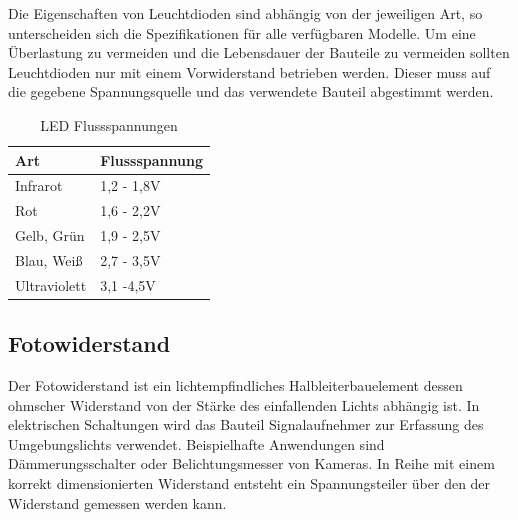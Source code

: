 Die Eigenschaften von Leuchtdioden sind abhängig von der jeweiligen Art, so unterscheiden sich die Spezifikationen für alle verfügbaren Modelle. Um eine Überlastung zu vermeiden und die Lebensdauer der Bauteile zu vermeiden sollten Leuchtdioden nur mit einem Vorwiderstand betrieben werden. Dieser muss auf die gegebene Spannungsquelle und das verwendete Bauteil abgestimmt werden.

\begin{table}[]
\centering
\caption{LED Flussspannungen}
\label{my-label}
\begin{tabular}{@{}|l|l|@{}}
\toprule
\rowcolor[HTML]{BBDAFF} 
Art          & Flussspannung \\ \midrule
Infrarot     & 1,2 - 1,8V    \\ \midrule
\rowcolor[HTML]{BBDAFF} 
Rot          & 1,6 - 2,2V    \\ \midrule
Gelb, Grün   & 1,9 - 2,5V    \\ \midrule
\rowcolor[HTML]{BBDAFF} 
Blau, Weiß   & 2,7 - 3,5V    \\ \midrule
Ultraviolett & 3,1 -4,5V     \\ \bottomrule
\end{tabular}
\end{table}

\subsection{Fotowiderstand}

Der Fotowiderstand ist ein lichtempfindliches Halbleiterbauelement dessen ohmscher Widerstand von der Stärke des einfallenden Lichts abhängig ist. In elektrischen Schaltungen wird das Bauteil Signalaufnehmer zur Erfassung des Umgebungslichts verwendet. Beispielhafte Anwendungen sind Dämmerungsschalter oder Belichtungsmesser von Kameras. In Reihe mit einem korrekt dimensionierten Widerstand entsteht ein Spannungsteiler über den der Widerstand gemessen werden kann.





